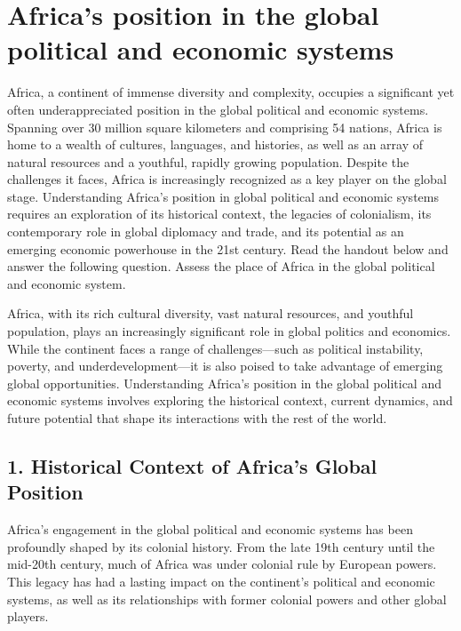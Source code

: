 \documentclass[10pt]{article}
\begin{document}
\section*{Africa's position in the global political and economic systems}
Africa, a continent of immense diversity and complexity, occupies a significant yet often
underappreciated position in the global political and economic systems. Spanning over 30
million square kilometers and comprising 54 nations, Africa is home to a wealth of cultures,
languages, and histories, as well as an array of natural resources and a youthful, rapidly growing
population. Despite the challenges it faces, Africa is increasingly recognized as a key player on
the global stage. Understanding Africa's position in global political and economic systems
requires an exploration of its historical context, the legacies of colonialism, its contemporary
role in global diplomacy and trade, and its potential as an emerging economic powerhouse in
the 21st century. Read the handout below and answer the following question. Assess the place
of Africa in the global political and economic system.

Africa, with its rich cultural diversity, vast natural resources, and youthful population, plays an
increasingly significant role in global politics and economics. While the continent faces a range
of challenges---such as political instability, poverty, and underdevelopment---it is also poised to
take advantage of emerging global opportunities. Understanding Africa's position in the global
political and economic systems involves exploring the historical context, current dynamics, and
future potential that shape its interactions with the rest of the world.

\subsection*{1. Historical Context of Africa's Global Position}
Africa's engagement in the global political and economic systems has been profoundly shaped
by its colonial history. From the late 19th century until the mid-20th century, much of Africa was
under colonial rule by European powers. This legacy has had a lasting impact on the continent's
political and economic systems, as well as its relationships with former colonial powers and
other global players.
\end{document}
